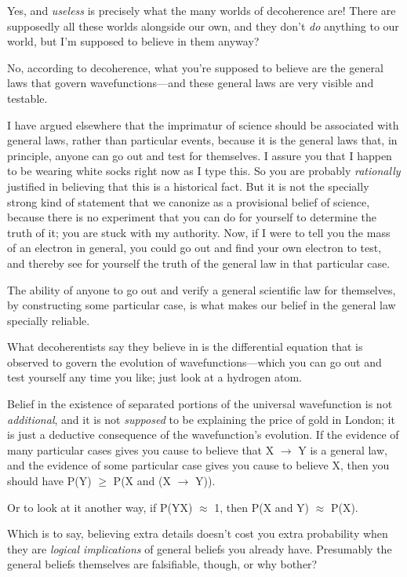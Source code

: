 {
 Yes, and \textit{useless} is precisely what the many worlds of
decoherence are! There are supposedly all these worlds alongside our
own, and they don't \textit{do} anything to our world,
but I'm supposed to believe in them anyway?}

{
 No, according to decoherence, what you're supposed
to believe are the general laws that govern wavefunctions---and these
general laws are very visible and testable.}

{
 I have argued elsewhere that the imprimatur of science should be
associated with general laws, rather than particular events, because it
is the general laws that, in principle, anyone can go out and test for
themselves. I assure you that I happen to be wearing white socks right
now as I type this. So you are probably \textit{rationally} justified
in believing that this is a historical fact. But it is not the
specially strong kind of statement that we canonize as a provisional
belief of science, because there is no experiment that you can do for
yourself to determine the truth of it; you are stuck with my authority.
Now, if I were to tell you the mass of an electron in general, you
could go out and find your own electron to test, and thereby see for
yourself the truth of the general law in that particular case.}

{
 The ability of anyone to go out and verify a general scientific
law for themselves, by constructing some particular case, is what makes
our belief in the general law specially reliable.}

{
 What decoherentists say they believe in is the differential
equation that is observed to govern the evolution of
wavefunctions---which you can go out and test yourself any time you
like; just look at a hydrogen atom.}

{
 Belief in the existence of separated portions of the universal
wavefunction is not \textit{additional}, and it is not
\textit{supposed} to be explaining the price of gold in London; it is
just a deductive consequence of the wavefunction's
evolution. If the evidence of many particular cases gives you cause to
believe that X $\rightarrow $ Y is a general law, and the evidence of
some particular case gives you cause to believe X, then you should have
P(Y) ${\geq}$ P(X and (X $\rightarrow $ Y)).}

{
 Or to look at it another way, if P(Y{\textbar}X) ${\approx}$ 1,
then P(X and Y) ${\approx}$ P(X).}

{
 Which is to say, believing extra details doesn't
cost you extra probability when they are \textit{logical implications}
of general beliefs you already have. Presumably the general beliefs
themselves are falsifiable, though, or why bother?}


